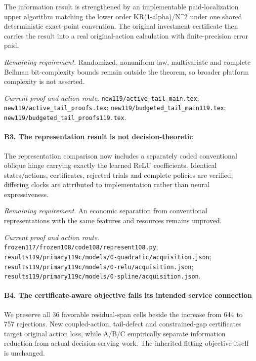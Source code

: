 The information result is strengthened by an implementable paid-localization upper algorithm matching the lower order KR(1-alpha)/N\textasciicircum{}2 under one shared deterministic exact-point convention. The original investment certificate then carries the result into a real original-action calculation with finite-precision error paid.

\par\emph{Remaining requirement.} Randomized, nonuniform-law, multivariate and complete Bellman bit-complexity bounds remain outside the theorem, so broader platform complexity is not asserted.

\par\emph{Current proof and action route.} \nolinkurl{new119/active_tail_main.tex}; \nolinkurl{new119/active_tail_proofs.tex}; \nolinkurl{new119/budgeted_tail_main119.tex}; \nolinkurl{new119/budgeted_tail_proofs119.tex}.

\paragraph{B3. The representation result is not decision-theoretic}

The representation comparison now includes a separately coded conventional oblique hinge carrying exactly the learned ReLU coefficients. Identical states/\allowbreak{}actions, certificates, rejected trials and complete policies are verified; differing clocks are attributed to implementation rather than neural expressiveness.

\par\emph{Remaining requirement.} An economic separation from conventional representations with the same features and resources remains unproved.

\par\emph{Current proof and action route.} \nolinkurl{frozen117/frozen108/code108/represent108.py}; \nolinkurl{results119/primary119c/models/0-quadratic/acquisition.json}; \nolinkurl{results119/primary119c/models/0-relu/acquisition.json}; \nolinkurl{results119/primary119c/models/0-spline/acquisition.json}.

\paragraph{B4. The certificate-aware objective fails its intended service connection}

We preserve all 36 favorable residual-span cells beside the increase from 644 to 757 rejections. New coupled-action, tail-defect and constrained-gap certificates target original action loss, while A/\allowbreak{}B/\allowbreak{}C empirically separate information reduction from actual decision-serving work. The inherited fitting objective itself is unchanged.

